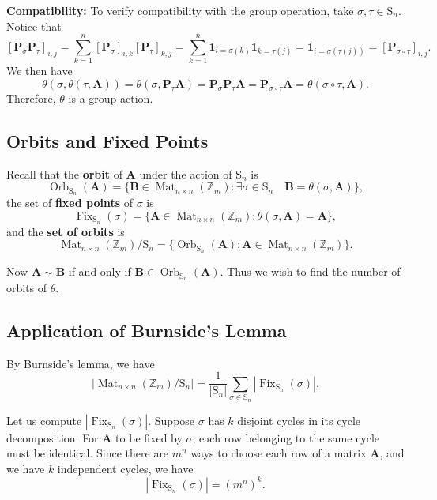 \documentclass[a4paper,12pt]{report}
\DeclareMathOperator{\Orb}{Orb}
\DeclareMathOperator{\Fix}{Fix}
\DeclareMathOperator{\Mat}{Mat}
\begin{document}
\medskip
\noindent\textbf{Compatibility:} To verify compatibility with the group operation, take $\sigma, \tau\in \mathrm{S}_n$. Notice that 
\[
    [\mathbf{P}_\sigma\mathbf{P}_\tau]_{i,j}
     =\sum_{k=1}^n [\mathbf{P}_\sigma]_{i,k} [\mathbf{P}_\tau]_{k,j}=\sum_{k=1}^n \mathbf{1}_{i=\sigma(k)} \mathbf{1}_{k=\tau(j)} 
     = \mathbf{1}_{i=\sigma(\tau(j))} =[\mathbf{P}_{\sigma\circ\tau}]_{i,j}.
\]
We then have 
\[
    \theta(\sigma,\theta(\tau, \mathbf{A}))=\theta(\sigma, \mathbf{P}_{\tau}\mathbf{A})=\mathbf{P}_{\sigma}\mathbf{P}_{\tau}\mathbf{A}=\mathbf{P}_{\sigma\circ\tau}\mathbf{A}=\theta(\sigma\circ\tau, \mathbf{A}).
\]
Therefore, $\theta$ is a group action. 

\subsection*{Orbits and Fixed Points}

Recall that the \textbf{orbit} of $\mathbf{A}$ under the action of $\mathrm{S}_n$ is 
\[
\Orb_{\mathrm{S}_n}(\mathbf{A})=\{\mathbf{B}\in\Mat_{n\times n}(\mathbb{Z}_m):\exists \sigma\in \mathrm{S}_n \quad \mathbf{B}=\theta(\sigma,\mathbf{A})\},
\]
the set of \textbf{fixed points} of $\sigma$ is 
\[
\Fix_{\mathrm{S}_n}(\sigma)=\{\mathbf{A}\in \Mat_{n\times n}(\mathbb{Z}_m):\theta(\sigma, \mathbf{A})=\mathbf{A}\},
\]
and the \textbf{set of orbits} is 
\[
\Mat_{n\times n}(\mathbb{Z}_m)/\mathrm{S}_n=\{\Orb_{\mathrm{S}_n}(\mathbf{A}):\mathbf{A}\in\Mat_{n\times n}(\mathbb{Z}_m)\}.
\]

Now $\mathbf{A}\sim\mathbf{B}$ if and only if $\mathbf{B}\in\Orb_{\mathrm{S}_n}(\mathbf{A})$. Thus we wish to find the number of orbits of $\theta$.

\subsection*{Application of Burnside's Lemma}

By Burnside's lemma, we have
\[
\left|\Mat_{n\times n}(\mathbb{Z}_m)/\mathrm{S}_n\right|=\frac{1}{|\mathrm{S}_n|}\sum_{\sigma\in \mathrm{S}_n} \left|\Fix_{\mathrm{S}_n}(\sigma)\right|.
\]

Let us compute $|\Fix_{\mathrm{S}_n}(\sigma)|$. Suppose $\sigma$ has $k$ disjoint cycles in its cycle decomposition. For $\mathbf{A}$ to be fixed by $\sigma$, each row belonging to the same cycle must be identical. Since there are $m^n$ ways to choose each row of a matrix $\mathbf{A}$, and we have $k$ independent cycles, we have 
\[
\left|\Fix_{\mathrm{S}_n}(\sigma)\right|=(m^n)^k.
\]
\end{document}
